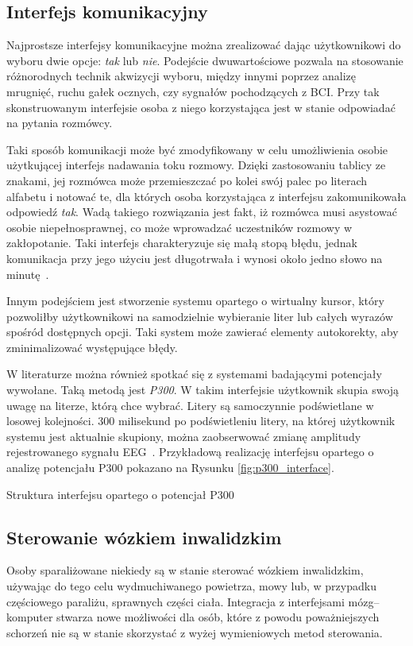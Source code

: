 \documentclass[skorowidz,skroty]{dyplomWEZUT}
\begin{document}
\subsection{Interfejs komunikacyjny\label{subsec:p300}}
Najprostsze interfejsy komunikacyjne można zrealizować dając użytkownikowi do wyboru dwie opcje: \textit{tak} lub \textit{nie}. Podejście dwuwartościowe pozwala na stosowanie różnorodnych technik akwizycji wyboru, między innymi poprzez analizę mrugnięć, ruchu gałek ocznych, czy sygnałów pochodzących z BCI. Przy tak skonstruowanym interfejsie osoba z niego korzystająca jest w stanie odpowiadać na pytania rozmówcy.

Taki sposób komunikacji może być zmodyfikowany w celu umożliwienia osobie użytkującej interfejs nadawania toku rozmowy. Dzięki zastosowaniu tablicy ze znakami, jej rozmówca może przemieszczać  po kolei swój palec po literach alfabetu i notować te, dla których osoba korzystająca z interfejsu zakomunikowała odpowiedź \textit{tak}. Wadą takiego rozwiązania jest fakt, iż rozmówca musi asystować osobie niepełnosprawnej, co może wprowadzać uczestników rozmowy w zakłopotanie. Taki interfejs charakteryzuje się małą stopą błędu, jednak komunikacja przy jego użyciu jest długotrwała i wynosi około jedno słowo na minutę~\cite{bci_trends}.

Innym podejściem jest stworzenie systemu opartego o wirtualny kursor, który pozwoliłby użytkownikowi na samodzielnie wybieranie liter lub całych wyrazów spośród dostępnych opcji. Taki system może zawierać elementy autokorekty, aby zminimalizować występujące błędy.

W literaturze można również spotkać się z systemami badającymi potencjały wywołane. Taką metodą jest \textit{P300}. W takim interfejsie użytkownik skupia swoją uwagę na literze, którą chce wybrać. Litery są samoczynnie podświetlane w losowej kolejności. 300 milisekund po podświetleniu litery, na której użytkownik systemu jest aktualnie skupiony, można zaobserwować zmianę amplitudy rejestrowanego sygnału EEG~\cite{bci_introduction}. Przykładową realizację interfejsu opartego o analizę potencjału P300 pokazano na Rysunku \vref{fig:p300_interface}.

{Struktura interfejsu opartego o potencjał P300\label{fig:p300_interface}}
{\cite{p300_interface}}


\subsection{Sterowanie wózkiem inwalidzkim}
Osoby sparaliżowane niekiedy są w stanie sterować wózkiem inwalidzkim, używając do tego celu wydmuchiwanego powietrza, mowy lub, w przypadku częściowego paraliżu, sprawnych części ciała. Integracja z interfejsami mózg--komputer stwarza nowe możliwości dla osób, które z powodu poważniejszych schorzeń nie są w stanie skorzystać z wyżej wymieniowych metod sterowania.
\end{document}
